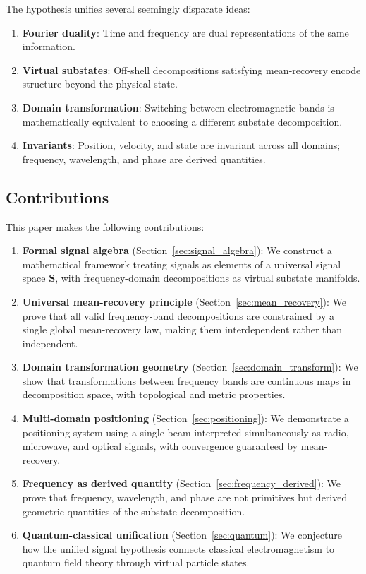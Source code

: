 \documentclass[twocolumn,11pt,a4paper]{article}
\newcommand{\Signal}{\mathbf{S}}
\begin{document}
The hypothesis unifies several seemingly disparate ideas:
\begin{enumerate}[nosep]
  \item \textbf{Fourier duality}: Time and frequency are dual representations of the same information.
  \item \textbf{Virtual substates}: Off-shell decompositions satisfying mean-recovery encode structure beyond the physical state.
  \item \textbf{Domain transformation}: Switching between electromagnetic bands is mathematically equivalent to choosing a different substate decomposition.
  \item \textbf{Invariants}: Position, velocity, and state are invariant across all domains; frequency, wavelength, and phase are derived quantities.
\end{enumerate}

\subsection{Contributions}

This paper makes the following contributions:

\begin{enumerate}[leftmargin=1.5em,topsep=2pt,itemsep=1pt]
  \item \textbf{Formal signal algebra} (Section~\ref{sec:signal_algebra}): We construct a mathematical framework treating signals as elements of a universal signal space $\Signal$, with frequency-domain decompositions as virtual substate manifolds.

  \item \textbf{Universal mean-recovery principle} (Section~\ref{sec:mean_recovery}): We prove that all valid frequency-band decompositions are constrained by a single global mean-recovery law, making them interdependent rather than independent.

  \item \textbf{Domain transformation geometry} (Section~\ref{sec:domain_transform}): We show that transformations between frequency bands are continuous maps in decomposition space, with topological and metric properties.

  \item \textbf{Multi-domain positioning} (Section~\ref{sec:positioning}): We demonstrate a positioning system using a single beam interpreted simultaneously as radio, microwave, and optical signals, with convergence guaranteed by mean-recovery.

  \item \textbf{Frequency as derived quantity} (Section~\ref{sec:frequency_derived}): We prove that frequency, wavelength, and phase are not primitives but derived geometric quantities of the substate decomposition.

  \item \textbf{Quantum-classical unification} (Section~\ref{sec:quantum}): We conjecture how the unified signal hypothesis connects classical electromagnetism to quantum field theory through virtual particle states.
\end{enumerate}
\end{document}
